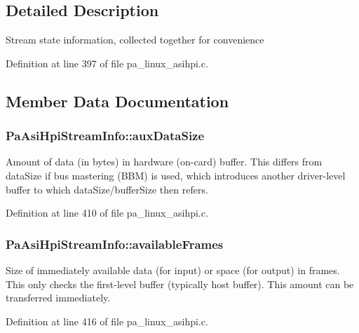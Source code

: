 \subsection{Detailed Description}
Stream state information, collected together for convenience 

Definition at line 397 of file pa\+\_\+linux\+\_\+asihpi.\+c.



\subsection{Member Data Documentation}
\subsubsection[{\texorpdfstring{aux\+Data\+Size}{auxDataSize}}]{ Pa\+Asi\+Hpi\+Stream\+Info\+::aux\+Data\+Size}\hypertarget{struct_pa_asi_hpi_stream_info_acbb424b6faff235b6c04e237fdba002b}{}\label{struct_pa_asi_hpi_stream_info_acbb424b6faff235b6c04e237fdba002b}
Amount of data (in bytes) in hardware (on-\/card) buffer. This differs from data\+Size if bus mastering (B\+BM) is used, which introduces another driver-\/level buffer to which data\+Size/buffer\+Size then refers. 

Definition at line 410 of file pa\+\_\+linux\+\_\+asihpi.\+c.

\subsubsection[{\texorpdfstring{available\+Frames}{availableFrames}}]{ Pa\+Asi\+Hpi\+Stream\+Info\+::available\+Frames}\hypertarget{struct_pa_asi_hpi_stream_info_aa237530f1e9ee1378e573634fec3ce37}{}\label{struct_pa_asi_hpi_stream_info_aa237530f1e9ee1378e573634fec3ce37}
Size of immediately available data (for input) or space (for output) in frames. This only checks the first-\/level buffer (typically host buffer). This amount can be transferred immediately. 

Definition at line 416 of file pa\+\_\+linux\+\_\+asihpi.\+c.

